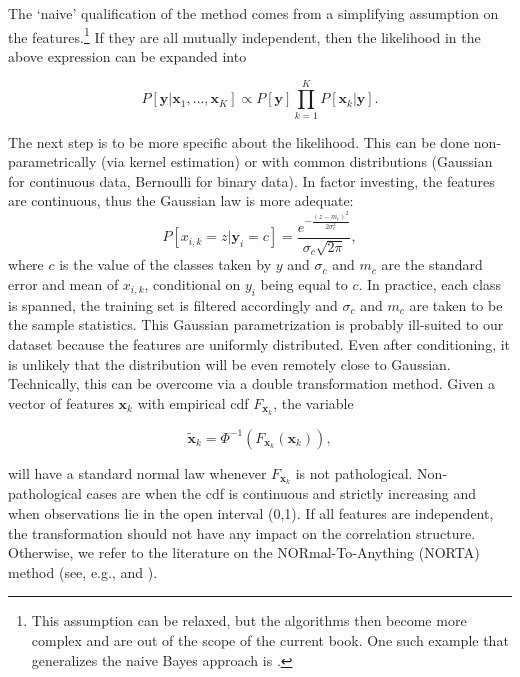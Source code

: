 The `naive' qualification of the method comes from a simplifying assumption on the features.\footnote{This assumption can be relaxed, but the algorithms then become more complex and are out of the scope of the current book. One such example that generalizes the naive Bayes approach is \cite{friedman1997bayesian}.} If they are all mutually independent, then the likelihood in the above expression can be expanded into

\begin{equation}
\label{eq:naivebayes3}
P[\textbf{y} | \textbf{x}_1,\dots,\textbf{x}_K] \propto P[\textbf{y}]\prod_{k=1}^K P[\textbf{x}_k| \textbf{y}].
\end{equation}

The next step is to be more specific about the likelihood. This can be done non-parametrically (via kernel estimation) or with common distributions (Gaussian for continuous data, Bernoulli for binary data). In factor investing, the features are continuous, thus the Gaussian law is more adequate:
\begin{equation}
P[x_{i,k}=z|\textbf{y}_i= c]=\frac{e^{-\frac{(z-m_c)^2}{2\sigma_c^2}}}{\sigma_c\sqrt{2\pi}},
\end{equation}
where $c$ is the value of the classes taken by $y$ and $\sigma_c$ and $m_c$ are the standard error and mean of $x_{i,k}$, conditional on $y_i$ being equal to $c$. In practice, each class is spanned, the training set is filtered accordingly and $\sigma_c$ and $m_c$ are taken to be the sample statistics. This Gaussian parametrization is probably ill-suited to our dataset because the features are uniformly distributed. Even after conditioning, it is unlikely that the distribution will be even remotely close to Gaussian. Technically, this can be overcome via a double transformation method. Given a vector of features $\textbf{x}_k$ with empirical cdf $F_{\textbf{x}_k}$, the variable

\begin{equation}
\label{eq:transf}
\tilde{\textbf{x}}_k=\Phi^{-1}\left(F_{\textbf{x}_k}(\textbf{x}_k) \right),
\end{equation}

will have a standard normal law whenever $F_{\textbf{x}_k}$ is not pathological. Non-pathological cases are when the cdf is continuous and strictly increasing and when observations lie in the open interval (0,1). If all features are independent, the transformation should not have any impact on the correlation structure. Otherwise, we refer to the literature on the NORmal-To-Anything (NORTA) method (see, e.g., \cite{chen2001initialization} and \cite{coqueret2017approximate}).


